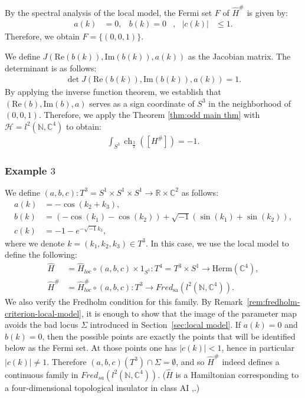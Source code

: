 \documentclass{amsart}
\theoremstyle{definition}
\theoremstyle{remark}
\begin{document}
By the spectral analysis of the local model, the Fermi set $F$ of $\hat{H}^{\#}$ is given by:
\begin{align*}
    a(k) &= 0, &b(k) = 0&, &\lvert c(k) \rvert &\leq 1.
\end{align*}
Therefore, we obtain $F = \{(0, 0, 1)\}$.

We define $J(\text{Re}(b(k)), \text{Im}(b(k)), a(k))$ as the Jacobian matrix.
The determinant is as follows:
\begin{align*}
    \det J(\text{Re}(b(k)), \text{Im}(b(k)), a(k)) = 1.
\end{align*}
By applying the inverse function theorem, we establish that $(\text{Re}(b), \text{Im}(b), a)$ serves as a sign coordinate of $S^3$ in the neighborhood of $(0, 0, 1)$.
Therefore, we apply the Theorem \ref{thm:odd main thm} with $\mathcal{H} = l^2(\mathbb{N}, \mathbb{C}^4)$ to obtain:
\begin{align*}
    \int_{S^3} \operatorname{ch}_{\frac{3}{2}}([H^{\#}]) = -1.
\end{align*}

\subsubsection{Example $3$}
\label{subsubsec:example3}

We define $(a, b, c) \colon T^3 = S^1 \times S^1 \times S^1 \to \mathbb{R} \times \mathbb{C}^2$ as follows:
\begin{align*}
    a(k) &= -\cos(k_2 + k_3), \\
    b(k) &= (-\cos(k_1) - \cos(k_2)) + \sqrt{-1} (\sin(k_1) + \sin(k_2)), \\
    c(k) &= -1 - e^{-\sqrt{-1} k_3},
\end{align*}
where we denote $k = (k_1, k_2, k_3) \in T^3$.
In this case, we use the local model to define the following:
\begin{align*}
    \hat{H} &= \hat{H}_{loc} \circ (a, b, c) \times 1_{S^1} \colon T^4 = T^3 \times S^1 \to \text{Herm}(\mathbb{C}^4), \\
    \hat{H}^{\#} &= \hat{H}^{\#}_{loc} \circ (a, b, c) \colon T^3 \to Fred_{\text{sa}}(l^2(\mathbb{N}, \mathbb{C}^4)).
\end{align*}
We also verify the Fredholm condition for this family.
By Remark~\ref{rem:fredholm-criterion-local-model}, it is enough to show that the image of
the parameter map avoids the bad locus $\Sigma$ introduced in Section~\ref{sec:local model}.
If $a(k)=0$ and $b(k)=0$, then the possible points are exactly the points that will be identified
below as the Fermi set.
At those points one has $|c(k)|<1$, hence in particular $|c(k)|\neq 1$.
Therefore $(a,b,c)(T^3)\cap \Sigma=\emptyset$, and so $\hat H^\#$ indeed defines a continuous
family in $Fred_{sa}(l^2(\mathbb N,\mathbb C^4))$.
($\hat{H}$ is a Hamiltonian corresponding to a four-dimensional topological insulator in class AI \cite{Qi},\cite{R}.)
\end{document}
